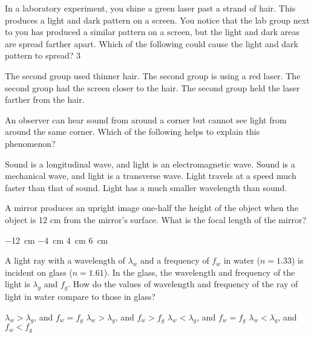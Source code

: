 \documentclass{../../../oss-ap12ibhl-print}
\begin{document}
\genheader


\begin{questions}
  \question In a laboratory experiment, you shine a green laser past a strand of
  hair. This produces a light and dark pattern on a screen. You notice that
  the lab group next to you has produced a similar pattern on a screen, but
  the light and dark areas are spread farther apart. Which of the following
  could cause the light and dark pattern to spread? 3
  \begin{choices}
    \choice The second group used thinner hair.
    \choice The second group is using a red laser.
    \choice The second group had the screen closer to the hair.
    \choice The second group held the laser farther from the hair.
  \end{choices}
    
  \question An observer can hear sound from around a corner but cannot see light
  from around the same corner. Which of the following helps to explain this
  phenomenon?
  \begin{choices}
    \choice Sound is a longitudinal wave, and light is an electromagnetic wave.
    \choice Sound is a mechanical wave, and light is a transverse wave.
    \choice Light travels at a speed much faster than that of sound.
    \choice Light has a much smaller wavelength than sound.
  \end{choices}
    
  \question A mirror produces an upright image one-half the height of the object
  when the object is 12 cm from the mirror's surface. What is the focal
  length of the mirror?
  \begin{choices}
    \choice\SI{-12}{\centi\metre}
    \choice\SI{-4}{\centi\metre}
    \choice\SI{4}{\centi\metre}
    \choice\SI{6}{\centi\metre}
  \end{choices}

  \question A light ray with a wavelength of $\lambda_w$ and a frequency of
  $f_w$ in water ($n=1.33$) is incident on glass ($n=1.61$). In the glass,
  the wavelength and frequency of the light is $\lambda_g$ and $f_g$. How do
  the values of wavelength and frequency of the ray of light in water compare
  to those in glass?
  \begin{choices}
    \choice $\lambda_w>\lambda_g$, and $f_w=f_g$
    \choice $\lambda_w>\lambda_g$, and $f_w>f_g$
    \choice $\lambda_w<\lambda_g$, and $f_w=f_g$
    \choice $\lambda_w<\lambda_g$, and $f_w<f_g$
  \end{choices}


\end{questions}
\end{document}
